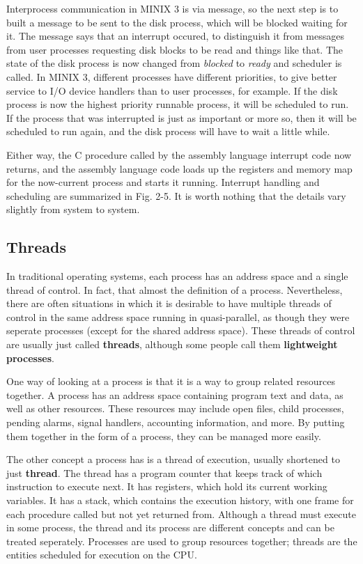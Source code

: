 \documentclass{book}
\newcommand {\kw}  [1] {\textbf{#1}}
\newcommand {\sys} [1] {\textsl{#1}}
\begin{document}
Interprocess communication in MINIX 3 is via message,
so the next step is to built a message to be sent to the disk process,
which will be blocked waiting for it.
The message says that an interrupt occured,
to distinguish it from messages from user processes requesting disk blocks to be read and things like that.
The state of the disk process is now changed from \sys{blocked} to \sys{ready} and scheduler is called.
In MINIX 3, different processes have different priorities, 
to give better service to I/O device handlers than to user processes, for example.
If the disk process is now the highest priority runnable process, it will be scheduled to run.
If the process that was interrupted is just as important or more so, 
then it will be scheduled to run again, and the disk process will have to wait a little while.

Either way, the C procedure called by the assembly language interrupt code now returns,
and the assembly language code loads up the registers and memory map for the now-current process and starts it running.
Interrupt handling and scheduling are summarized in Fig. 2-5.
It is worth nothing that the details vary slightly from system to system.

\subsection{Threads}
In traditional operating systems, each process has an address space and a single thread of control.
In fact, that almost the definition of a process.
Nevertheless, there are often situations in which it is desirable to 
have multiple threads of control in the same address space running in quasi-parallel,
as though they were seperate processes (except for the shared address space).
These threads of control are usually just called \kw{threads},
although some people call them \kw{lightweight processes}.

One way of looking at a process is that it is a way to group related resources together.
A process has an address space containing program text and data, as well as other resources.
These resources may include open files, child processes, pending alarms, signal handlers, accounting information, and more.
By putting them together in the form of a process, they can be managed more easily.

The other concept a process has is a thread of execution, usually shortened to just \kw{thread}.
The thread has a program counter that keeps track of which instruction to execute next.
It has registers, which hold its current working variables.
It has a stack, which contains the execution history, with one frame for each procedure called but not yet returned from.
Although a thread must execute in some process, the thread and its process are different concepts and can be treated seperately.
Processes are used to group resources together; threads are the entities scheduled for execution on the CPU.
\end{document}

